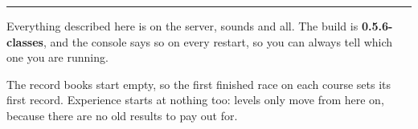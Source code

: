 \documentclass[11pt,a4paper]{article}
\begin{document}
\vspace{10pt}
\hrule
\vspace{6pt}

{\small Everything described here is on the server, sounds and all. The build
is \textbf{0.5.6-classes}, and the console says so on every restart, so you
can always tell which one you are running.

The record books start empty, so the first finished race on each course sets
its first record. Experience starts at nothing too: levels only move from here
on, because there are no old results to pay out for.}
\end{document}
